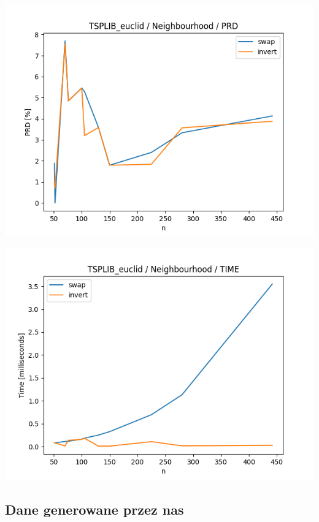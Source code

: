 \documentclass{article}
\begin{document}
\begin{center}
\includegraphics[width=\textwidth, 
                   height = 0.4\textheight, 
                   keepaspectratio]
                  {plots/neighbours_tsplib_euclid_prd} 
\end{center}

\begin{center}
\includegraphics[width=\textwidth, 
                   height = 0.4\textheight, 
                   keepaspectratio]
                  {plots/neighbours_tsplib_euclid_time} 
\end{center}


\subsection{Dane generowane przez nas}
\end{document}
